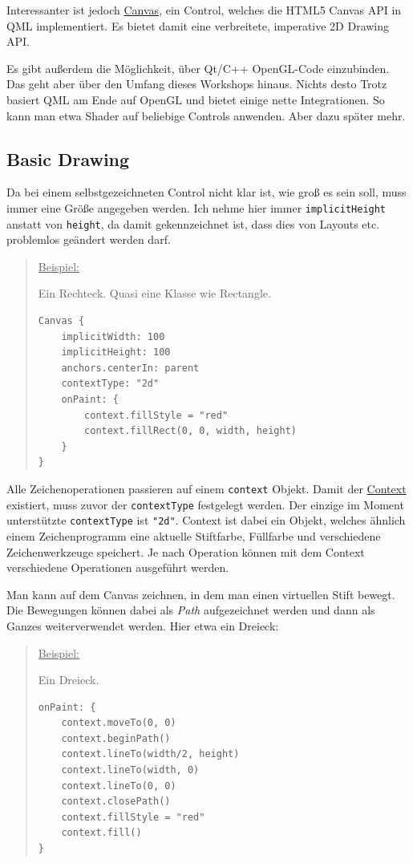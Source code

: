 \documentclass[a4paper]{article}
\begin{document}
Interessanter ist jedoch \href{http://qt-project.org/doc/qt-5/qml-qtquick-canvas.html}{Canvas}, ein Control, welches die HTML5 Canvas API in QML implementiert. Es bietet damit eine verbreitete, imperative 2D Drawing API.

Es gibt außerdem die Möglichkeit, über Qt/C++ OpenGL-Code einzubinden. Das geht aber über den Umfang dieses Workshops hinaus. Nichts desto Trotz basiert QML am Ende auf OpenGL und bietet einige nette Integrationen. So kann man etwa Shader auf beliebige Controls anwenden. Aber dazu später mehr.

\subsection{Basic Drawing}
\label{sec-3-1}
Da bei einem selbstgezeichneten Control nicht klar ist, wie groß es sein soll, muss immer eine Größe angegeben werden. Ich nehme hier immer \verb~implicitHeight~ anstatt von \verb~height~, da damit gekennzeichnet ist, dass dies von Layouts etc. problemlos geändert werden darf.

\begin{quote}
\uline{Beispiel:}

Ein Rechteck. Quasi eine Klasse wie Rectangle.

\begin{verbatim}
Canvas {
    implicitWidth: 100
    implicitHeight: 100
    anchors.centerIn: parent
    contextType: "2d"
    onPaint: {
        context.fillStyle = "red"
        context.fillRect(0, 0, width, height)
    }
}
\end{verbatim}
\end{quote}

Alle Zeichenoperationen passieren auf einem \verb~context~ Objekt. Damit der \href{http://qt-project.org/doc/qt-5/qml-qtquick-context2d.html}{Context} existiert, muss zuvor der \verb~contextType~ festgelegt werden. Der einzige im Moment unterstützte \verb~contextType~ ist \verb~"2d"~. Context ist dabei ein Objekt, welches ähnlich einem Zeichenprogramm eine aktuelle Stiftfarbe, Füllfarbe und verschiedene Zeichenwerkzeuge speichert. Je nach Operation können mit dem Context verschiedene Operationen ausgeführt werden.

Man kann auf dem Canvas zeichnen, in dem man einen virtuellen Stift bewegt. Die Bewegungen können dabei als \emph{Path} aufgezeichnet werden und dann als Ganzes weiterverwendet werden. Hier etwa ein Dreieck:

\begin{quote}
\uline{Beispiel:}

Ein Dreieck.

\begin{verbatim}
onPaint: {
    context.moveTo(0, 0)
    context.beginPath()
    context.lineTo(width/2, height)
    context.lineTo(width, 0)
    context.lineTo(0, 0)
    context.closePath()
    context.fillStyle = "red"
    context.fill()
}
\end{verbatim}
\end{quote}
\end{document}

